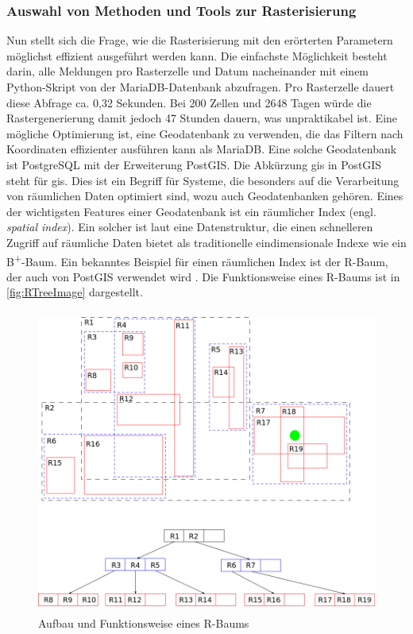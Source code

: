 \subsubsection{Auswahl von Methoden und Tools zur Rasterisierung}
\label{sec:RasterisierungMethodenTools}
Nun stellt sich die Frage, wie die Rasterisierung mit den erörterten Parametern möglichst effizient ausgeführt werden kann.
Die einfachste Möglichkeit besteht darin, alle Meldungen pro Rasterzelle und Datum nacheinander mit einem Python-Skript von der MariaDB-Datenbank abzufragen.
Pro Rasterzelle dauert diese Abfrage ca. 0,32 Sekunden.
Bei 200 Zellen und 2648 Tagen würde die Rastergenerierung damit jedoch 47 Stunden dauern, was unpraktikabel ist.
Eine mögliche Optimierung ist, eine Geodatenbank zu verwenden, die das Filtern nach Koordinaten effizienter ausführen kann als MariaDB.
Eine solche Geodatenbank ist PostgreSQL mit der Erweiterung PostGIS.
Die Abkürzung \acrshort{gis} in PostGIS steht für \acrlong{gis}.
Dies ist ein Begriff für Systeme, die besonders auf die Verarbeitung von räumlichen Daten optimiert sind, wozu auch Geodatenbanken gehören.
Eines der wichtigsten Features einer Geodatenbank ist ein räumlicher Index (engl. \emph{spatial index}).
Ein solcher ist laut \cite[S. 2707 f.]{SpatialIndexingTechniques} eine Datenstruktur, die einen schnelleren Zugriff auf räumliche Daten bietet als traditionelle eindimensionale Indexe wie ein B\textsuperscript{+}-Baum.
Ein bekanntes Beispiel für einen räumlichen Index ist der R-Baum, der auch von PostGIS verwendet wird \cite{PostGISSpatialIndex}.
Die Funktionsweise eines R-Baums ist in \autoref{fig:RTreeImage} dargestellt.

\begin{figure}[h]
    \centering
    \includegraphics[width=1.0\textwidth,height=10cm,keepaspectratio=true]{content/images/R-tree.png}
    \caption{Aufbau und Funktionsweise eines R-Baums \cite{RTreeImage}}
    \label{fig:RTreeImage}
\end{figure}

